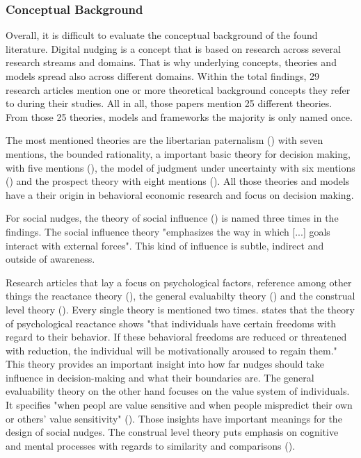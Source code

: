 \subsubsection{Conceptual Background} 
Overall, it is difficult to evaluate the conceptual background of the found literature. Digital nudging is a concept that is based on research across several research streams and domains. That is why underlying concepts, theories and models spread also across different domains. Within the total findings, 29 research articles mention one or more theoretical background concepts they refer to during their studies. All in all, those papers mention 25 different theories. From those 25 theories, models and frameworks the majority is only named once. 

The most mentioned theories are the libertarian paternalism (\cite{thaler_nudge:_2009}) with seven mentions, the bounded rationality, a important basic theory for decision making, with five mentions (\cite{simon_behavioral_1955}), the model of judgment under uncertainty with six mentions (\cite{tversky_judgment_1974}) and the prospect theory with eight mentions (\cite{kahneman_prospect_1979}). All those theories and models have a their origin in behavioral economic research and focus on decision making.

For social nudges, the theory of social influence (\cite{cialdini_social_2004}) is named three times in the findings. The social influence theory "emphasizes the way in which [...] goals interact with external forces". This kind of influence is subtle, indirect and outside of awareness.

Research articles that lay a focus on psychological factors, reference among other things the reactance theory (\cite{brehm_theory_1966}), the general evaluabilty theory (\cite{hsee_general_2010}) and the construal level theory (\cite{trope_construal-level_2010}). Every single theory is mentioned two times. \cite{brehm_theory_1966} states that the theory of psychological reactance shows "that individuals have certain freedoms with regard to their behavior. If these behavioral freedoms are reduced or threatened with reduction, the individual will be motivationally aroused to regain them." This theory provides an important insight into how far nudges should take influence in decision-making and what their boundaries are. The general evaluability theory on the other hand focuses on the value system of individuals. It specifies "when peopl are value sensitive and when people mispredict their own or others' value sensitivity" (\cite{hsee_general_2010}). Those insights have important meanings for the design of social nudges. The construal level theory puts emphasis on cognitive and mental processes with regards to similarity and comparisons (\cite{trope_construal-level_2010}).

